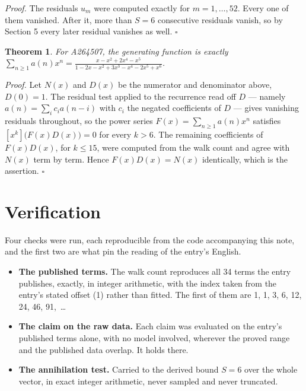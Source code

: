 \documentclass[11pt]{article}
\newtheorem{theorem}{Theorem}
\theoremstyle{definition}
\begin{document}
{\itshape Proof.} The residuals $u_m$ were computed exactly for $m = 1,\dots,52$. Every one of them vanished. After it, more than $S = 6$ consecutive residuals vanish, so by Section 5 every later residual vanishes as well. $\square$

\begin{theorem} For A264507, the generating function is exactly $\sum_{n\ge 1} a(n)x^n = \frac{x - x^{2} + 2x^{4} - x^{5}}{1 - 2x - x^{2} + 3x^{3} - x^{4} - 2x^{5} + x^{6}}$.\end{theorem}

{\itshape Proof.} Let $N(x)$ and $D(x)$ be the numerator and denominator above, $D(0)=1$. The residual test applied to the recurrence read off $D$ --- namely $a(n) = \sum_i c_i a(n-i)$ with $c_i$ the negated coefficients of $D$ --- gives vanishing residuals throughout, so the power series $F(x)=\sum_{n\ge 1}a(n)x^n$ satisfies $[x^k]\bigl(F(x)D(x)\bigr) = 0$ for every $k > 6$. The remaining coefficients of $F(x)D(x)$, for $k \le 15$, were computed from the walk count and agree with $N(x)$ term by term. Hence $F(x)D(x) = N(x)$ identically, which is the assertion. $\square$

\section{Verification}

Four checks were run, each reproducible from the code accompanying this note, and the first two are what pin the reading of the entry's English.

\begin{itemize}

\item {\bfseries The published terms.} The walk count reproduces all 34 terms the entry publishes, exactly, in integer arithmetic, with the index taken from the entry's stated offset (1) rather than fitted. The first of them are 1, 1, 3, 6, 12, 24, 46, 91,~\dots

\item {\bfseries The claim on the raw data.} Each claim was evaluated on the entry's published terms alone, with no model involved, wherever the proved range and the published data overlap. It holds there.

\item {\bfseries The annihilation test.} Carried to the derived bound $S = 6$ over the whole vector, in exact integer arithmetic, never sampled and never truncated.

\end{itemize}
\end{document}
